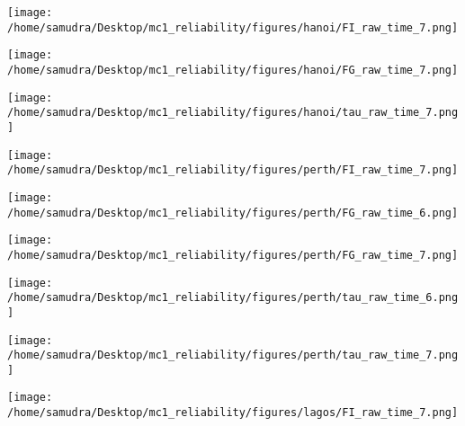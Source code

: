 \documentclass[a4paper]{article}
\def\lthtmlcheckvsize{\ifdim\ht\sizebox<\vsize 
  \ifdim\wd\sizebox<\hsize\expandafter\hfill\fi \expandafter\vfill
  \else\expandafter\vss\fi}%
\begin{document}
{\newpage\clearpage
{}%
\texttt{[image: /home/samudra/Desktop/mc1\_reliability/figures/hanoi/FI\_raw\_time\_7.png]}%
\lthtmlpictureZ
\lthtmlcheckvsize\clearpage}

{\newpage\clearpage
{}%
\texttt{[image: /home/samudra/Desktop/mc1\_reliability/figures/hanoi/FG\_raw\_time\_7.png]}%
\lthtmlpictureZ
\lthtmlcheckvsize\clearpage}

{\newpage\clearpage
{}%
\texttt{[image: /home/samudra/Desktop/mc1\_reliability/figures/hanoi/tau\_raw\_time\_7.png]}%
\lthtmlpictureZ
\lthtmlcheckvsize\clearpage}

{\newpage\clearpage
{}%
\texttt{[image: /home/samudra/Desktop/mc1\_reliability/figures/perth/FI\_raw\_time\_7.png]}%
\lthtmlpictureZ
\lthtmlcheckvsize\clearpage}

{\newpage\clearpage
{}%
\texttt{[image: /home/samudra/Desktop/mc1\_reliability/figures/perth/FG\_raw\_time\_6.png]}%
\lthtmlpictureZ
\lthtmlcheckvsize\clearpage}

{\newpage\clearpage
{}%
\texttt{[image: /home/samudra/Desktop/mc1\_reliability/figures/perth/FG\_raw\_time\_7.png]}%
\lthtmlpictureZ
\lthtmlcheckvsize\clearpage}

{\newpage\clearpage
{}%
\texttt{[image: /home/samudra/Desktop/mc1\_reliability/figures/perth/tau\_raw\_time\_6.png]}%
\lthtmlpictureZ
\lthtmlcheckvsize\clearpage}

{\newpage\clearpage
{}%
\texttt{[image: /home/samudra/Desktop/mc1\_reliability/figures/perth/tau\_raw\_time\_7.png]}%
\lthtmlpictureZ
\lthtmlcheckvsize\clearpage}

{\newpage\clearpage
{}%
\texttt{[image: /home/samudra/Desktop/mc1\_reliability/figures/lagos/FI\_raw\_time\_7.png]}%
\lthtmlpictureZ
\lthtmlcheckvsize\clearpage}
\end{document}
